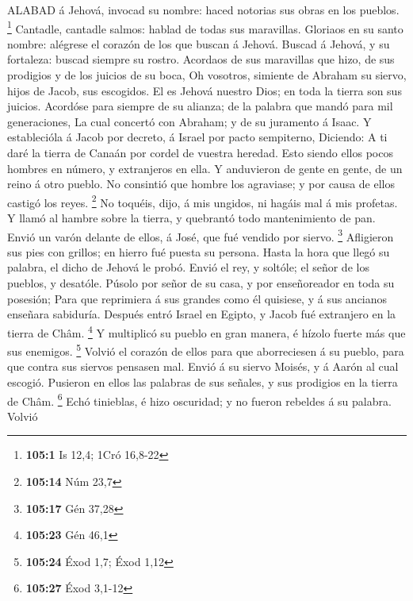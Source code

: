  ALABAD á Jehová, invocad su nombre: haced notorias sus
obras en los pueblos. \footnote{\textbf{105:1} Is 12,4; 1Cró 16,8-22}
 Cantadle, cantadle salmos: hablad de todas sus maravillas.
 Gloriaos en su santo nombre: alégrese el corazón de los que
buscan á Jehová.  Buscad á Jehová, y su fortaleza: buscad
siempre su rostro.  Acordaos de sus maravillas que hizo, de
sus prodigios y de los juicios de su boca,  Oh vosotros,
simiente de Abraham su siervo, hijos de Jacob, sus escogidos.
 El es Jehová nuestro Dios; en toda la tierra son sus
juicios.  Acordóse para siempre de su alianza; de la palabra
que mandó para mil generaciones,  La cual concertó con
Abraham; y de su juramento á Isaac.  Y establecióla á Jacob
por decreto, á Israel por pacto sempiterno,  Diciendo: A ti
daré la tierra de Canaán por cordel de vuestra heredad. 
Esto siendo ellos pocos hombres en número, y extranjeros en ella.
 Y anduvieron de gente en gente, de un reino á otro pueblo.
 No consintió que hombre los agraviase; y por causa de
ellos castigó los reyes. \footnote{\textbf{105:14} Núm 23,7}
 No toquéis, dijo, á mis ungidos, ni hagáis mal á mis
profetas.  Y llamó al hambre sobre la tierra, y quebrantó
todo mantenimiento de pan.  Envió un varón delante de
ellos, á José, que fué vendido por siervo. \footnote{\textbf{105:17} Gén
  37,28}  Afligieron sus pies con grillos; en hierro fué
puesta su persona.  Hasta la hora que llegó su palabra, el
dicho de Jehová le probó.  Envió el rey, y soltóle; el
señor de los pueblos, y desatóle.  Púsolo por señor de su
casa, y por enseñoreador en toda su posesión;  Para que
reprimiera á sus grandes como él quisiese, y á sus ancianos enseñara
sabiduría.  Después entró Israel en Egipto, y Jacob fué
extranjero en la tierra de Châm. \footnote{\textbf{105:23} Gén 46,1}
 Y multiplicó su pueblo en gran manera, é hízolo fuerte más
que sus enemigos. \footnote{\textbf{105:24} Éxod 1,7; Éxod 1,12}
 Volvió el corazón de ellos para que aborreciesen á su
pueblo, para que contra sus siervos pensasen mal.  Envió á
su siervo Moisés, y á Aarón al cual escogió.  Pusieron en
ellos las palabras de sus señales, y sus prodigios en la tierra de Châm.
\footnote{\textbf{105:27} Éxod 3,1-12}  Echó tinieblas, é
hizo oscuridad; y no fueron rebeldes á su palabra.  Volvió
